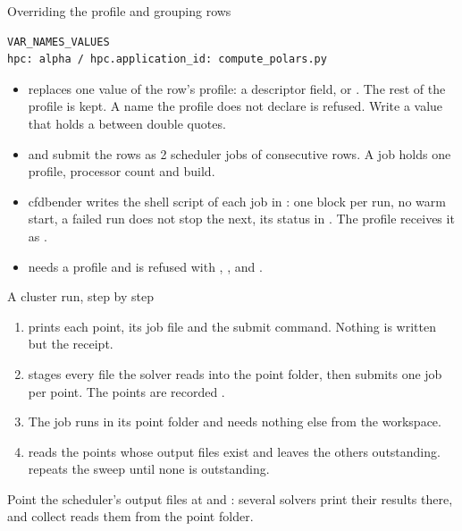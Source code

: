 \begin{frame}[fragile]{Overriding the profile and grouping rows}
\begin{lstlisting}
VAR_NAMES_VALUES
hpc: alpha / hpc.application_id: compute_polars.py
\end{lstlisting}
\begin{itemize}\small
  \item {} replaces one value of the row's profile: a
        descriptor field,  or . The rest of
        the profile is kept. A name the profile does not declare is refused.
        Write a value that holds a \code{/} between double quotes.
  \item {} and 
        submit the rows as 2 scheduler jobs of consecutive rows. A job holds
        one profile, processor count and build.
  \item cfdbender writes the shell script of each job in
        : one block per run, no warm start,
        a failed run does not stop the next, its status in .
        The profile receives it as .
  \item {} needs a profile and is refused with ,
        ,  and .
\end{itemize}
\end{frame}

\begin{frame}{A cluster run, step by step}
\begin{enumerate}
  \item {} prints each point, its job file and the
        submit command. Nothing is written but the receipt.
  \item {} stages every file the solver reads into
        the point folder, then submits one job per point. The points are
        recorded .
  \item The job runs in its point folder and needs nothing else from the
        workspace.
  \item {} reads the points whose output files
        exist and leaves the others outstanding.  repeats the
        sweep until none is outstanding.
\end{enumerate}
\begin{cfdbpitfall}
Point the scheduler's output files at  and
: several solvers print their results there, and
collect reads them from the point folder.
\end{cfdbpitfall}
\end{frame}

